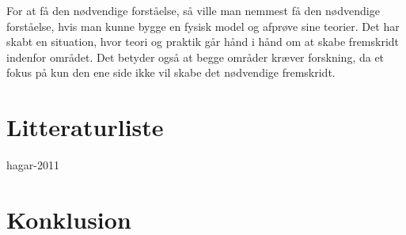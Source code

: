 \documentclass{article}
\begin{document}
For at få den nødvendige forståelse, så ville man nemmest få den nødvendige forståelse, hvis man kunne bygge en fysisk model og afprøve sine teorier. Det har skabt en situation, hvor teori og praktik går hånd i hånd om at skabe fremskridt indenfor området. Det betyder også at begge områder kræver forskning, da et fokus på kun den ene side ikke vil skabe det nødvendige fremskridt.

\section{Litteraturliste}
hagar-2011

\section{Konklusion}
\end{document}
